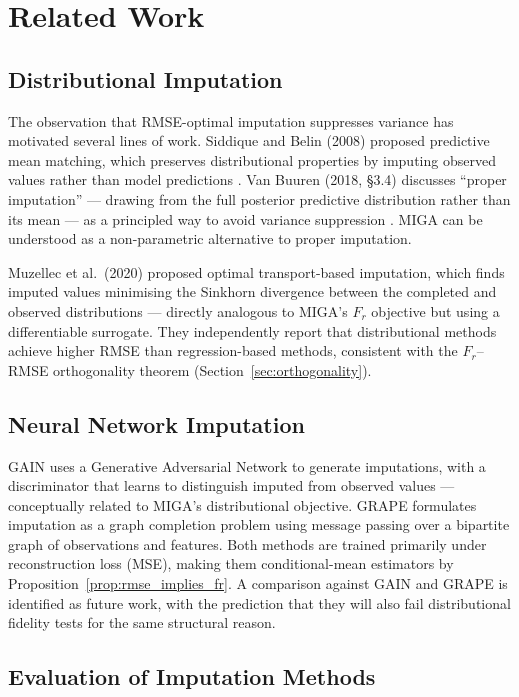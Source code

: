 \section{Related Work}

\subsection{Distributional Imputation}

The observation that RMSE-optimal imputation suppresses variance has motivated several lines of work. Siddique and Belin (2008) proposed predictive mean matching, which preserves distributional properties by imputing observed values rather than model predictions \cite{SiddiqueeBelin2008}. Van Buuren (2018, \S3.4) discusses ``proper imputation'' --- drawing from the full posterior predictive distribution rather than its mean --- as a principled way to avoid variance suppression \cite{vanBuuren2018}. MIGA can be understood as a non-parametric alternative to proper imputation.

Muzellec et al.\ (2020) proposed optimal transport-based imputation, which finds imputed values minimising the Sinkhorn divergence between the completed and observed distributions \cite{Muzellec2020} --- directly analogous to MIGA's $F_r$ objective but using a differentiable surrogate. They independently report that distributional methods achieve higher RMSE than regression-based methods, consistent with the $F_r$--RMSE orthogonality theorem (Section~\ref{sec:orthogonality}).

\subsection{Neural Network Imputation}

GAIN \cite{Yoon2018} uses a Generative Adversarial Network to generate imputations, with a discriminator that learns to distinguish imputed from observed values --- conceptually related to MIGA's distributional objective. GRAPE \cite{You2020} formulates imputation as a graph completion problem using message passing over a bipartite graph of observations and features. Both methods are trained primarily under reconstruction loss (MSE), making them conditional-mean estimators by Proposition~\ref{prop:rmse_implies_fr}. A comparison against GAIN and GRAPE is identified as future work, with the prediction that they will also fail distributional fidelity tests for the same structural reason.

\subsection{Evaluation of Imputation Methods}

